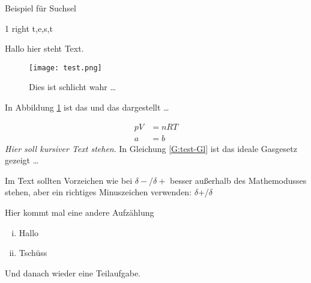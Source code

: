 \documentclass[./main.tex]{subfiles}
\begin{document}
\renewcommand{\tasktitle}{Allgemeine Chemie}
\renewcommand{\taskpoints}{3.5} %
\renewcommand{\taskweight}{8.7}
\aufgabenanfang
Beispiel für Suchsel
\begin{alphabetsoup}[10][10]
     {1} {right} {t,e,s,t}
\end{alphabetsoup}
\listofclues
Hallo hier steht Text. \par

\blindtext
{}

\blindtext
{}
\blindtext

\begin{figure}[H]
\centering
\texttt{[image: test.png]}
\caption{Dies ist schlicht wahr \ldots }
\label{A:test-Abb}
\end{figure}

In Abbildung \ref{A:test-Abb} ist das und das dargestellt \ldots 

\begin{align}
    pV &= nRT \label{G:test-Gl}\\
    a &= b
\end{align}
\textit{Hier soll kursiver Text stehen}.
In Gleichung \ref{G:test-Gl} ist das ideale Gasgesetz gezeigt \ldots 

Im Text sollten Vorzeichen wie bei $\delta-$/$\delta+$ besser au\ss{}erhalb des Mathemodusses stehen, aber ein richtiges Minuszeichen verwenden: $\delta$+/$\delta$\textminus{}

Hier kommt mal eine andere Aufz\"ahlung
\begin{enumerate}[(i)]
    \item Hallo
    \item Tsch\"uss
\end{enumerate}
Und danach wieder eine Teilaufgabe.

\aufgabenende
\end{document}
